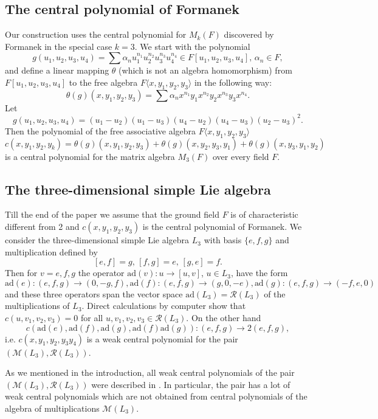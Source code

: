 \documentclass[10]{amsart}
\theoremstyle{definition}
\begin{document}
\subsection{The central polynomial of Formanek}
Our construction uses the central polynomial for $M_k(F)$ discovered by Formanek \cite{F1} in the special case $k=3$. We start with the polynomial
\[
g(u_1,u_2,u_3,u_4)=\sum\alpha_nu_1^{n_1}u_2^{n_2}u_3^{n_3}u_4^{n_4}\in F[u_1,u_2,u_3,u_4], \,\alpha_n\in F,
\]
and define a linear mapping $\theta$ (which is not an algebra homomorphism)
from $F[u_1,u_2,u_3,u_4]$ to the free algebra $F\langle x,y_1,y_2,y_3\rangle$
in the following way:
\[
\theta(g)(x,y_1,y_2,y_3)=\sum\alpha_nx^{n_1}y_1x^{n_2}y_2x^{n_3}y_3x^{n_4}.
\]
Let
\[
g(u_1,u_2,u_3,u_4)=
(u_1-u_2)(u_1-u_3)(u_4-u_2)(u_4-u_3)(u_2-u_3)^2.
\]
Then the polynomial of the free associative algebra
$F\langle x,y_1,y_2,y_3\rangle$
\[
c(x,y_1,y_2,y_k)=\theta(g)(x,y_1,y_2,y_3)+
\theta(g)(x,y_2,y_3,y_1)+\theta(g)(x,y_3,y_1,y_2)
\]
is a central polynomial for the matrix algebra $M_3(F)$
over every field $F$.

\subsection{The three-dimensional simple Lie algebra}
Till the end of the paper we assume that the ground field $F$ is of characteristic different from 2
and $c(x,y_1,y_2,y_3)$ is the central polynomial of Formanek.
We consider the three-dimensional simple Lie algebra $L_3$ with basis $\{e,f,g\}$ and multiplication defined by
\[
[e,f]=g,\,[f,g]=e,\,[g,e]=f.
\]
Then for $v=e,f,g$ the operator $\text{ad}(v):u\to[u,v]$, $u\in L_3$, have the form
\[
\text{ad}(e):(e,f,g)\to (0,-g,f),\text{ad}(f):(e,f,g)\to (g,0,-e),\text{ad}(g):(e,f,g)\to (-f,e,0)
\]
and these three operators span the vector space $\text{ad}(L_3)={\mathcal R}(L_3)$ of the multiplications of $L_3$.
Direct calculations by computer show that
$c(u,v_1,v_2,v_3)=0$ for all $u,v_1,v_2,v_3\in{\mathcal R}(L_3)$. On the other hand
\[
c(\text{ad}(e),\text{ad}(f),\text{ad}(g),\text{ad}(f)\text{ad}(g)):(e,f,g)\to 2(e,f,g),
\]
i.e. $c(x,y_1,y_2,y_3y_4)$ is a weak central polynomial for the pair $({\mathcal M}(L_3),{\mathcal R}(L_3))$.

As we mentioned in the introduction, all weak central polynomials of the pair $({\mathcal M}(L_3),{\mathcal R}(L_3))$ were described in \cite{DoD}.
In particular, the pair has a lot of weak central polynomials which are not obtained from central polynomials of the algebra of multiplications ${\mathcal M}(L_3)$.
\end{document}
